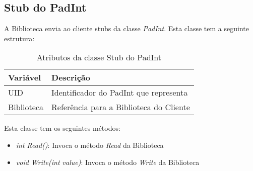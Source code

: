 \subsection{Stub do PadInt}

A Biblioteca envia ao cliente stubs da classe \textit{PadInt}. Esta classe tem a seguinte estrutura:

\begin{table}[H]
\centering
\begin{tabular}{| p{2cm} | p{} |}
\hline
\textbf{Variável} & \textbf{Descrição} \\
\hline
UID & Identificador do PadInt que representa \\
\hline
Biblioteca & Referência para a Biblioteca do Cliente \\
\hline
\end{tabular}
\caption{Atributos da classe Stub do PadInt}
\end{table}

Esta classe tem os seguintes métodos:

\begin{itemize}
	\item \textit{int Read()}: Invoca o método \textit{Read} da Biblioteca
	\item \textit{void Write(int value)}: Invoca o método \textit{Write} da Biblioteca
\end{itemize}